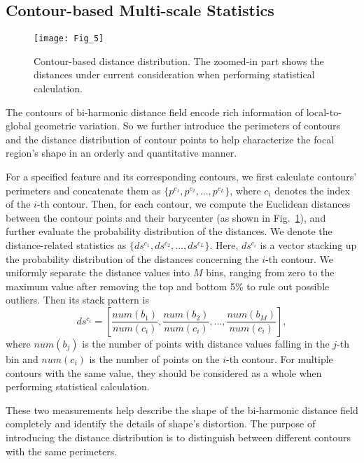 \subsection{Contour-based Multi-scale Statistics}

\begin{figure}[!to]
\begin{center}
\texttt{[image: Fig\_5]}
\end{center}
\caption[Contour-based distance distribution.]
  {Contour-based distance distribution. The zoomed-in part
  shows the distances under current consideration when performing
  statistical calculation.}
\label{Descriptor}
\end{figure}

The contours of bi-harmonic distance field encode rich information of
local-to-global geometric variation. So we further introduce the
perimeters of contours and the distance distribution of contour points
to help characterize the focal region's shape in an orderly and
quantitative manner.

For a specified feature and its corresponding contours, we first
calculate contours' perimeters and concatenate them as
$\{p^{c_1},p^{c_2},...,p^{c_L} \}$, where $c_i$ denotes the index of
the $i$-th contour. Then, for each contour, we compute the Euclidean
distances between the contour points and their barycenter (as shown in
Fig.~\ref{Descriptor}), and further evaluate the probability
distribution of the distances. We denote the distance-related
statistics as $\{ds^{c_1},ds^{c_2},...,ds^{c_L} \}$. Here, $ds^{c_i}$
is a vector stacking up the probability distribution of the distances
concerning the $i$-th contour. We uniformly separate the distance
values into $M$ bins, ranging from zero to the maximum value after
removing the top and bottom 5\% to rule out possible outliers. Then
its stack pattern is
\begin{equation}
  ds^{c_i}=[\frac{num(b_1)}{num(c_i)},\frac{num(b_2)}{num(c_i)},...,\frac{num(b_M)}{num(c_i)}],
\end{equation}
where $num(b_j)$ is the number of points with distance values falling
in the $j$-th bin and $num(c_i)$ is the number of points on the $i$-th
contour. For multiple contours with the same value, they should be
considered as a whole when performing statistical calculation.

These two measurements help describe the shape of the bi-harmonic
distance field completely and identify the details of shape's
distortion. The purpose of introducing the distance distribution is
to distinguish between different contours with the same perimeters.

